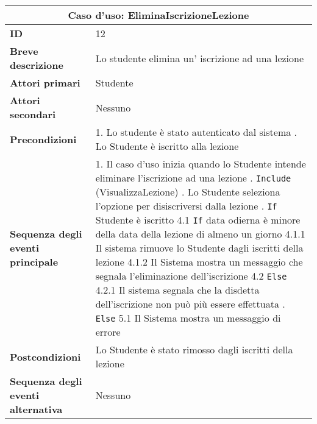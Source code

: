 \documentclass[11pt,a4paper]{report}
\begin{document}

\begin{table}[h!]
\centering
\renewcommand{\arraystretch}{1.3}
\begin{tabular}{|p{4.2cm}|p{10.2cm}|}
\hline
\multicolumn{2}{|c|}{\textbf{Caso d’uso: EliminaIscrizioneLezione}} \\ \hline
\textbf{ID} & 12 \\ \hline
\textbf{Breve descrizione} & Lo studente elimina un' iscrizione ad una lezione \\ \hline
\textbf{Attori primari} & Studente \\ \hline
\textbf{Attori secondari} & Nessuno \\ \hline
\textbf{Precondizioni} &
1. Lo studente è stato autenticato dal sistema \newline
2. Lo Studente è iscritto alla lezione \\ \hline
\textbf{Sequenza degli eventi principale} &
1. Il caso d’uso inizia quando lo Studente intende eliminare l'iscrizione ad una lezione \newline
2. \texttt{Include} (VisualizzaLezione) \newline
3. Lo Studente seleziona l’opzione per disiscriversi dalla lezione \newline
4. \texttt{If} Studente è iscritto \newline
\hspace*{0.5cm} 4.1 \texttt{If} data odierna è minore della data della lezione di almeno un giorno \newline
\hspace*{1cm} 4.1.1 Il sistema rimuove lo Studente dagli iscritti della lezione \newline
\hspace*{1cm} 4.1.2 Il Sistema mostra un messaggio che segnala l’eliminazione dell’iscrizione \newline
\hspace*{0.5cm} 4.2 \texttt{Else} \newline
\hspace*{1cm} 4.2.1 Il sistema segnala che la disdetta dell’iscrizione non può più essere effettuata \newline
5. \texttt{Else} \newline
\hspace*{0.5cm} 5.1 Il Sistema mostra un messaggio di errore \\ \hline
\textbf{Postcondizioni} & Lo Studente è stato rimosso dagli iscritti della lezione \\ \hline
\textbf{Sequenza degli eventi alternativa} & Nessuno \\ \hline
\end{tabular}
\end{table}
\end{document}
